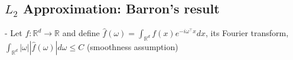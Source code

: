













\subsection*{$L_{2}$ Approximation: Barron's result}
- Let $f: \mathbb{R}^{d} \rightarrow \mathbb{R}$ and define $\hat{f}(\omega)=\int_{\mathbb{R}^{d}} f(x) e^{-i \omega^{\top} x} d x$, its Fourier transform, $\int_{\mathbb{R}^{d}}|\omega||\hat{f}(\omega)| d \omega \leq C$ (smoothness assumption)

